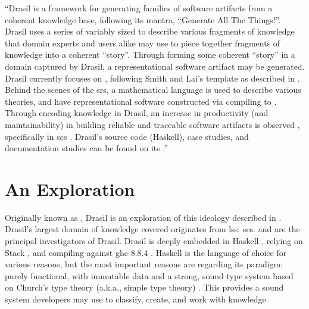 
\begin{mdleftbar}
      ``Drasil is a framework for generating families of software artifacts from
      a coherent knowledge base, following its mantra, ``Generate All The
      Things!''. Drasil uses a series of variably sized  to describe
      various fragments of knowledge that domain experts and users alike may use
      to piece together fragments of knowledge into a coherent ``story''.
      Through forming some coherent ``story'' in a domain captured by Drasil, a
      representational software artifact may be generated. Drasil currently
      focuses on , following Smith and Lai's  template as
      described in \cite{SmithAndLai2005}. Behind the scenes of the \acs{srs}, a
      mathematical language is used to describe various theories, and have
      representational software constructed via compiling to 
      \cite{Carette2019}. Through encoding knowledge in Drasil, an increase in
      productivity (and maintainability) in building reliable and traceable
      software artifacts is observed \cite{SzymczakEtAl2016}, specifically in
      \acs{scs} \cite{Smith2018}. Drasil's source code (Haskell), case studies,
      and documentation studies can be found on its
      .''
      \cite{Balaci2021Poster}
\end{mdleftbar}

\section{An Exploration}

Originally known as  , Drasil is an exploration of this
ideology described in . Drasil's largest domain of knowledge
covered originates from \acs{lss}: \acl{scs}.  and  are the principal investigators of
Drasil. Drasil is deeply embedded in Haskell \cite{Haskell2010}, relying on
Stack , and compiling against \acs{ghc} 8.8.4 \cite{GHC884}.
Haskell is the language of choice for various reasons, but the most important
reasons are regarding its paradigm: purely functional, with immutable data and a
strong, sound type system based on Church's type theory (a.k.a., simple type
theory) . This provides a sound system
developers may use to classify, create, and work with knowledge.

